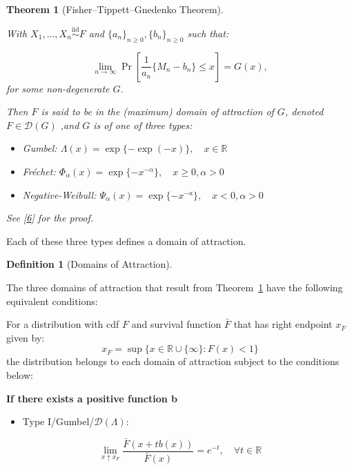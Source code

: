 \documentclass[
  10pt,
  a4paper,
]{scrreprt}
\providecommand{\tightlist}{%
  \setlength{\itemsep}{0pt}\setlength{\parskip}{0pt}}\usepackage{longtable,booktabs,array}
\theoremstyle{definition}
\newtheorem{definition}{Definition}[section]
\theoremstyle{plain}
\newtheorem{theorem}{Theorem}[section]
\theoremstyle{plain}
\theoremstyle{remark}
\begin{document}
{\begin{theorem}[Fisher--Tippett--Gnedenko
Theorem]\protect\hypertarget{thm-evt}{}\label{thm-evt}

With \(X_1, \ldots,X_n \overset{\mathrm{iid}}{\sim} F\) and
\(\{ a_n\}_{n\ge0}, \{ b_n\}_{n\ge0}\) such that:

\[\lim_{n\rightarrow\infty}\Pr\left[\displaystyle\frac{1}{a_n}\{M_n-b_n\}\le x\right] = G(x),\]
for some non-degenerate \(G\).

Then \(F\) is said to be in the (maximum) domain of attraction of \(G\),
denoted \(F\in\mathcal D(G)\) ,and \(G\) is of one of three types:

\begin{itemize}
\tightlist
\item
  Gumbel: \(\Lambda(x) = \exp\{-\exp(-x)\},\quad x \in \mathbb R\)
\item
  Fréchet:
  \(\Phi_\alpha(x) = \exp\{-x^{-\alpha}\},\quad x\ge 0,\alpha>0\)
\item
  Negative-Weibull:
  \(\Psi_\alpha(x) = \exp\{-x^{-a}\},\quad x<0,\alpha>0\)
\end{itemize}

See {[}\protect\hyperlink{ref-haan06}{6}{]} for the proof.

\end{theorem}

Each of these three types defines a domain of attraction.

\begin{definition}[Domains of
Attraction]\protect\hypertarget{def-doa}{}\label{def-doa}

The three domains of attraction that result from Theorem~\ref{thm-evt}
have the following equivalent conditions:

For a distribution with cdf \(F\) and survival function \(\bar F\) that
has right endpoint \(x_F\) given by: \[
x_F = \sup\{x \in \mathbb R \cup\{\infty\}:F(x)<1\}
\] the distribution belongs to each domain of attraction subject to the
conditions below:

\textbf{If there exists a positive function b}

\begin{itemize}
\tightlist
\item
  Type I/Gumbel/\(\mathcal D(\Lambda)\):
\end{itemize}

\[
\lim_{x\uparrow x_F} \displaystyle\frac{\bar F(x+tb(x))}{\bar F(x)} = e^{-t},\quad \forall t\in\mathbb R
\]


\end{definition}}
\end{document}
